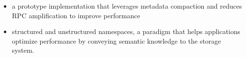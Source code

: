 \begin{itemize}

  \item a prototype implementation that leverages metadata compaction and
  reduces RPC amplification to improve performance

  \item structured and unstructured namespaces, a paradigm that helps
  applications optimize performance by conveying semantic knowledge to the
  storage system.

\end{itemize}
